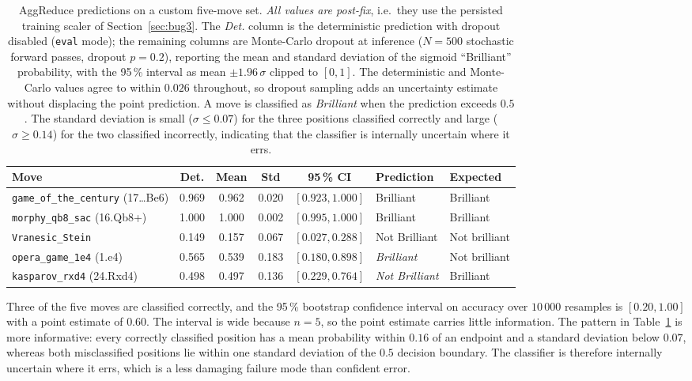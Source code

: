 \documentclass[11pt,a4paper]{article}
\begin{document}
\begin{table}[h]
\centering\small
\caption{AggReduce predictions on a custom five-move set. \emph{All
  values are post-fix}, i.e.\ they use the persisted training scaler of
  Section~\ref{sec:bug3}. The \emph{Det.} column is the deterministic
  prediction with dropout disabled (\texttt{eval} mode); the remaining
  columns are Monte-Carlo dropout at inference ($N = 500$ stochastic
  forward passes, dropout $p = 0.2$), reporting the mean and standard
  deviation of the sigmoid ``Brilliant'' probability, with the 95\,\%
  interval as mean $\pm 1.96\,\sigma$ clipped to $[0, 1]$. The
  deterministic and Monte-Carlo values agree to within $0.026$
  throughout, so dropout sampling adds an uncertainty estimate without
  displacing the point prediction. A move is classified as
  \emph{Brilliant} when the prediction exceeds $0.5$. The standard
  deviation is small ($\sigma \le 0.07$) for the three positions
  classified correctly and large ($\sigma \ge 0.14$) for the two
  classified incorrectly, indicating that the classifier is internally
  uncertain where it errs.}
\label{tab:five}
\begin{tabular}{@{}lccccll@{}}
\toprule
\textbf{Move} & \textbf{Det.} & \textbf{Mean} & \textbf{Std} &
\textbf{95\,\% CI} & \textbf{Prediction} & \textbf{Expected} \\
\midrule
\texttt{game\_of\_the\_century} (17\dots Be6) & 0.969 & 0.962 & 0.020 & $[0.923, 1.000]$ & Brilliant              & Brilliant     \\
\texttt{morphy\_qb8\_sac} (16.Qb8+)           & 1.000 & 1.000 & 0.002 & $[0.995, 1.000]$ & Brilliant              & Brilliant     \\
\texttt{Vranesic\_Stein}                      & 0.149 & 0.157 & 0.067 & $[0.027, 0.288]$ & Not Brilliant          & Not brilliant \\
\texttt{opera\_game\_1e4} (1.e4)              & 0.565 & 0.539 & 0.183 & $[0.180, 0.898]$ & \textit{Brilliant}     & Not brilliant \\
\texttt{kasparov\_rxd4} (24.Rxd4)             & 0.498 & 0.497 & 0.136 & $[0.229, 0.764]$ & \textit{Not Brilliant} & Brilliant     \\
\bottomrule
\end{tabular}
\end{table}

Three of the five moves are classified correctly, and the 95\,\%
bootstrap confidence interval on accuracy over $10\,000$ resamples is
$[0.20, 1.00]$ with a point estimate of $0.60$. The interval is wide
because $n = 5$, so the point estimate carries little information.
The pattern in Table~\ref{tab:five} is more informative: every
correctly classified position has a mean probability within $0.16$ of
an endpoint and a standard deviation below $0.07$, whereas both
misclassified positions lie within one standard deviation of the
$0.5$ decision boundary. The classifier is therefore internally
uncertain where it errs, which is a less damaging failure mode than
confident error.
\end{document}
